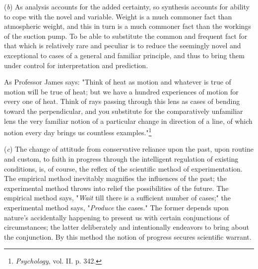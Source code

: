 \documentclass[letterpaper]{book}
\begin{document}
(\emph{b}) As analysis accounts for the added certainty, so synthesis
accounts for ability to cope with the novel and variable. Weight is a
much commoner fact than atmospheric weight, and this in turn is a much
commoner fact than the workings of the suction pump. To be able to
substitute the common and frequent fact for that which is relatively
rare and peculiar is to reduce the seemingly novel and exceptional to
cases of a general and familiar principle, and thus to bring them under
control for interpretation and prediction.

As Professor James says: "Think of heat as motion and whatever is true
of motion will be true of heat; but we have a hundred experiences of
motion for every one of heat. Think of rays passing through this lens as
cases of bending toward the perpendicular, and
you
substitute for the comparatively unfamiliar lens the very familiar
notion of a particular change in direction of a line, of which notion
every day brings us countless
examples."\footnote{\emph{Psychology}, vol. II. p. 342.}


(\emph{c}) The change of attitude from conservative reliance upon the
past, upon routine and custom, to faith in progress through the
intelligent regulation of existing conditions, is, of course, the reflex
of the scientific method of experimentation. The empirical method
inevitably magnifies the influences of the past; the experimental method
throws into relief the possibilities of the future. The empirical method
says, "\emph{Wait} till there is a sufficient number of cases;" the
experimental method says, "\emph{Produce} the cases." The former depends
upon nature's accidentally happening to present us with certain
conjunctions of circumstances; the latter deliberately and intentionally
endeavors to bring about the conjunction. By this method the notion of
progress secures scientific warrant.

\end{document}
